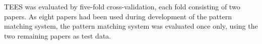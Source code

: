 
TEES was evaluated by five-fold cross-validation, each fold consisting of two papers. As eight papers had been used during development of the pattern matching system, the pattern matching system was evaluated once only, using the two remaining papers as test data.


